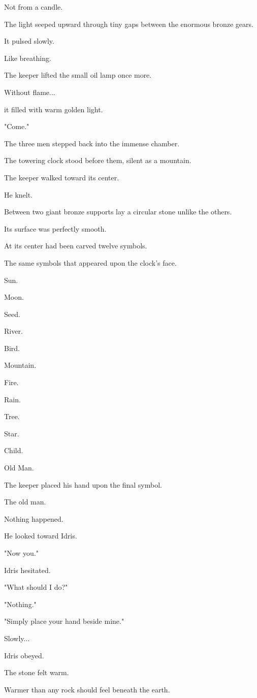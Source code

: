 \documentclass[12pt,openany]{book}
\begin{document}
Not from a candle.

The light seeped upward through tiny gaps between the enormous bronze gears.

It pulsed slowly.

Like breathing.

The keeper lifted the small oil lamp once more.

Without flame...

it filled with warm golden light.

"Come."

The three men stepped back into the immense chamber.

The towering clock stood before them, silent as a mountain.

The keeper walked toward its center.

He knelt.

Between two giant bronze supports lay a circular stone unlike the others.

Its surface was perfectly smooth.

At its center had been carved twelve symbols.

The same symbols that appeared upon the clock's face.

Sun.

Moon.

Seed.

River.

Bird.

Mountain.

Fire.

Rain.

Tree.

Star.

Child.

Old Man.

The keeper placed his hand upon the final symbol.

The old man.

Nothing happened.

He looked toward Idris.

"Now you."

Idris hesitated.

"What should I do?"

"Nothing."

"Simply place your hand beside mine."

Slowly...

Idris obeyed.

The stone felt warm.

Warmer than any rock should feel beneath the earth.
\end{document}
